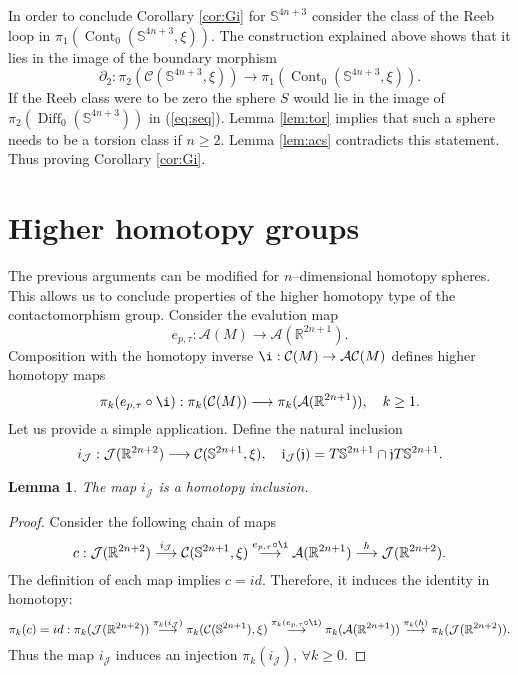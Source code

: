 \documentclass[10pt]{amsart}
\newtheorem{lemma}[proposition]{Lemma}
\begin{document}
\noindent In order to conclude Corollary \ref{cor:Gi} for ${\mathbb{S}}^{4n+3}$ consider the class of the Reeb loop in $\pi_1({\operatorname{Cont}}_0({\mathbb{S}}^{4n+3},\xi))$. The construction explained above shows that it lies in the image of the boundary morphism
$$\partial_2:\pi_2({\mathcal{C}}({\mathbb{S}}^{4n+3},\xi))\longrightarrow\pi_1({\operatorname{Cont}}_0({\mathbb{S}}^{4n+3},\xi)).$$
If the Reeb class were to be zero the sphere $S$ would lie in the image of $\pi_2({\operatorname{Diff}}_0({\mathbb{S}}^{4n+3}))$ in (\ref{eq:seq}). Lemma \ref{lem:tor} implies that such a sphere needs to be a torsion class if $n\geq 2$. Lemma \ref{lem:acs} contradicts this statement. Thus proving Corollary \ref{cor:Gi}.\\

\section{Higher homotopy groups} \label{sec:gener}
\noindent The previous arguments can be modified for $n$--dimensional homotopy spheres. This allows us to conclude properties of the higher homotopy type of the contactomorphism group. Consider the evalution map
$$
e_{p,\tau}: {\mathcal{A}}(M) \longrightarrow {\mathcal{A}}({\mathbb{R}}^{2n+1}).
$$
Composition with the homotopy inverse $\i: {\mathcal{C}}(M) \to {\mathcal{A}}{\mathcal{C}}(M)$
defines higher homotopy maps
$$
\pi_k(e_{p,\tau} \circ \i): \pi_{k}({\mathcal{C}}(M)) \longrightarrow \pi_k({\mathcal{A}}({\mathbb{R}}^{2n+1})),\quad k \geq 1.
$$
Let us provide a simple application. Define the natural inclusion
$$
i_{{\mathcal{J}}}: {{\mathcal{J}}}({\mathbb{R}}^{2n+2}) \longrightarrow {\mathcal{C}}({\mathbb{S}}^{2n+1},\xi),\quad\mbox i_{{\mathcal{J}}}({\mathfrak{j}})= T{\mathbb{S}}^{2n+1} \cap {\mathfrak{j}} T{\mathbb{S}}^{2n+1}.$$
\begin{lemma} \label{lem:inclu}
The map $i_{{\mathcal{J}}}$ is a homotopy inclusion.
\end{lemma}
\begin{proof}
Consider the following chain of maps
$$
c: {{\mathcal{J}}}({\mathbb{R}}^{2n+2}) \stackrel{i_{{\mathcal{J}}}}{\longrightarrow} {\mathcal{C}}({\mathbb{S}}^{2n+1},\xi) \stackrel{e_{p,\tau} \circ \i}{\longrightarrow} {\mathcal{A}}({\mathbb{R}}^{2n+1}) \stackrel{h}{\longrightarrow} {{\mathcal{J}}}({\mathbb{R}}^{2n+2}).
$$
The definition of each map implies $c= id$. Therefore, it induces the identity in homotopy:
$$
\pi_k(c)=id: \pi_k({{\mathcal{J}}}({\mathbb{R}}^{2n+2})) \stackrel{\pi_k(i_{{\mathcal{J}}})}{\longrightarrow} \pi_k({\mathcal{C}}({\mathbb{S}}^{2n+1}),\xi) \stackrel{\pi_k(e_{p,\tau}\circ \i)}{\longrightarrow} \pi_k({\mathcal{A}}({\mathbb{R}}^{2n+1})) \stackrel{\pi_k(h)}{\longrightarrow} \pi_k({{\mathcal{J}}}({\mathbb{R}}^{2n+2})).
$$
Thus the map $i_{{\mathcal{J}}}$ induces an injection $\pi_k(i_{{\mathcal{J}}})$, $\forall k\geq0$.
\end{proof}
\end{document}
